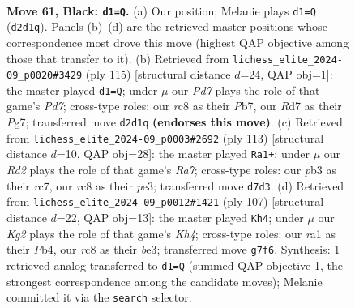 \documentclass[11pt]{article}
\begin{document}
\clearpage

\begin{figure}[p]\centering
\begin{subfigure}{0.46\textwidth}\centering
\resizebox{\linewidth}{!}{%
\newchessgame
\chessboard[
  setfen={2R5/3r2k1/8/p6r/5K2/1P6/3p3P/R7 b - - 0 61},
  showmover=false,
  pgfstyle=straightmove, color=movearrow, markmove={d2-d1}
]}
\caption{}
\end{subfigure}\hfill
\begin{subfigure}{0.46\textwidth}\centering
\resizebox{\linewidth}{!}{%
\newchessgame
\chessboard[
  setfen={8/pp1r2p1/8/8/k7/P3KP1P/3p4/1R6 b - - 3 58},
  showmover=false,
  pgfstyle=straightmove, color=movearrow, markmove={d2-d1}
]}
\caption{}
\end{subfigure}
\\[4pt]
\begin{subfigure}{0.46\textwidth}\centering
\resizebox{\linewidth}{!}{%
\newchessgame
\chessboard[
  setfen={3r2k1/2R5/1R6/p4Pp1/3P4/4P3/rp6/6K1 b - - 0 57},
  showmover=false,
  pgfstyle=straightmove, color=movearrow, markmove={a2-a1}
]}
\caption{}
\end{subfigure}\hfill
\begin{subfigure}{0.46\textwidth}\centering
\resizebox{\linewidth}{!}{%
\newchessgame
\chessboard[
  setfen={8/5PR1/8/3p1r1k/1p6/p3B3/P7/4K3 b - - 1 54},
  showmover=false,
  pgfstyle=straightmove, color=movearrow, markmove={h5-h4}
]}
\caption{}
\end{subfigure}
\caption{\textbf{Move 61, Black: \texttt{d1=Q}.} (a) Our position; Melanie plays \texttt{d1=Q} (\texttt{d2d1q}). Panels (b)--(d) are the retrieved master positions whose correspondence most drove this move (highest QAP objective among those that transfer to it). (b) Retrieved from \texttt{lichess\_elite\_2024-09\_p0020\#3429} (ply 115) [structural distance $d$=24, QAP obj=1]: the master played \texttt{d1=Q}; under $\mu$ our \emph{Pd7} plays the role of that game's \emph{Pd7}; cross-type roles: our \emph{r}c8 as their \emph{P}b7, our \emph{R}d7 as their \emph{P}g7; transferred move \texttt{d2d1q} \textbf{(endorses this move)}. (c) Retrieved from \texttt{lichess\_elite\_2024-09\_p0003\#2692} (ply 113) [structural distance $d$=10, QAP obj=28]: the master played \texttt{Ra1+}; under $\mu$ our \emph{Rd2} plays the role of that game's \emph{Ra7}; cross-type roles: our \emph{p}b3 as their \emph{r}c7, our \emph{r}c8 as their \emph{p}e3; transferred move \texttt{d7d3}. (d) Retrieved from \texttt{lichess\_elite\_2024-09\_p0012\#1421} (ply 107) [structural distance $d$=22, QAP obj=13]: the master played \texttt{Kh4}; under $\mu$ our \emph{Kg2} plays the role of that game's \emph{Kh4}; cross-type roles: our \emph{r}a1 as their \emph{P}b4, our \emph{r}c8 as their \emph{b}e3; transferred move \texttt{g7f6}. Synthesis: 1 retrieved analog transferred to \texttt{d1=Q} (summed QAP objective 1, the strongest correspondence among the candidate moves); Melanie committed it via the \texttt{search} selector.}
\label{fig:thought-m121}
\end{figure}
\end{document}
